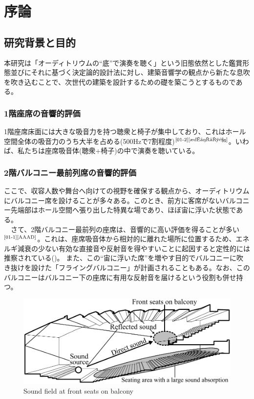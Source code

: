 \chapter{序論}
\thispagestyle{fancy}
\nobreak
\section{研究背景と目的}
本研究は「オーディトリウムの“底”で演奏を聴く」という旧態依然とした鑑賞形態並びにそれに基づく決定論的設計法に対し、建築音響学の観点から新たな息吹を吹き込むことで、次世代の建築を設計するための礎を築こうとするものである。

\subsection{1階座席の音響的評価}
1階座席床面には大きな吸音力を持つ聴衆と椅子が集中しており、これはホール空間全体の吸音力のうち大半を占める(500Hzで7割程度)$^{\text{\cite{01-2}{\cite{椅子吸音}}}}$。いわば、私たちは座席吸音体(聴衆+椅子)の中で演奏を聴いている。

\subsection{2階バルコニー最前列席の音響的評価}
ここで、収容人数や舞台へ向けての視野を確保する観点から、オーディトリウムにバルコニー席を設けることが多々ある。このとき、前方に客席がないバルコニー先端部はホール空間へ張り出した特異な場であり、ほぼ宙に浮いた状態である。
\\　さて、2階バルコニー最前列の座席は、音響的に高い評価を得ることが多い$^{\text{\cite{01-1}{\cite{AAAD}}}}$。これは、座席吸音体から相対的に離れた場所に位置するため、エネルギ減衰の少ない有効な直接音や反射音を得やすいことに起因すると定性的には推察されている()。
また、この“宙に浮いた席”を増やす目的でバルコニーに吹き抜けを設けた「フライングバルコニー」が計画されることもある。なお、このバルコニーはバルコニー下の座席に有用な反射音を届けるという役割も併せ持つ。
\\
\begin{figure}[h]
    \centering
    \includegraphics[keepaspectratio,scale=0.8]{01_att/second_balcony.pdf}
    \caption{\hspace{1mm}Sound field at front seats on balcony}
    \label{fig:2階バルコニー最前列席の音場}
\end{figure}

